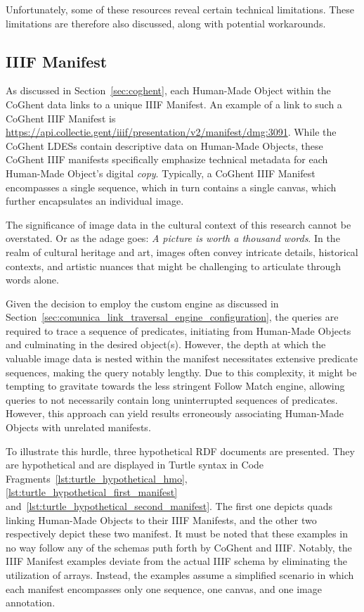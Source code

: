 Unfortunately, some of these resources reveal certain technical limitations. These limitations are therefore also discussed, along with potential workarounds.

\subsection{IIIF Manifest}
\label{subsec:links_to_follow_manifest}

As discussed in Section~\ref{sec:coghent}, each Human-Made Object within the CoGhent data links to a unique IIIF Manifest. An example of a link to such a CoGhent IIIF Manifest is \url{https://api.collectie.gent/iiif/presentation/v2/manifest/dmg:3091}. While the CoGhent LDESs contain descriptive data on Human-Made Objects, these CoGhent IIIF manifests specifically emphasize technical metadata for each Human-Made Object's digital \textit{copy}. Typically, a CoGhent IIIF Manifest encompasses a single sequence, which in turn contains a single canvas, which further encapsulates an individual image.

The significance of image data in the cultural context of this research cannot be overstated. Or as the adage goes: \textit{A picture is worth a thousand words}. In the realm of cultural heritage and art, images often convey intricate details, historical contexts, and artistic nuances that might be challenging to articulate through words alone.

Given the decision to employ the custom engine as discussed in Section~\ref{sec:comunica_link_traversal_engine_configuration}, the queries are required to trace a sequence of predicates, initiating from Human-Made Objects and culminating in the desired object(s). However, the depth at which the valuable image data is nested within the manifest necessitates extensive predicate sequences, making the query notably lengthy. Due to this complexity, it might be tempting to gravitate towards the less stringent Follow Match engine, allowing queries to not necessarily contain long uninterrupted sequences of predicates. However, this approach can yield results erroneously associating Human-Made Objects with unrelated manifests.

To illustrate this hurdle, three hypothetical RDF documents are presented. They are hypothetical and are displayed in Turtle syntax in Code Fragments~\ref{lst:turtle_hypothetical_hmo}, \ref{lst:turtle_hypothetical_first_manifest} and~\ref{lst:turtle_hypothetical_second_manifest}. The first one depicts quads linking Human-Made Objects to their IIIF Manifests, and the other two respectively depict these two manifest. It must be noted that these examples in no way follow any of the schemas puth forth by CoGhent and IIIF. Notably, the IIIF Manifest examples deviate from the actual IIIF schema by eliminating the utilization of arrays. Instead, the examples assume a simplified scenario in which each manifest encompasses only one sequence, one canvas, and one image annotation.

